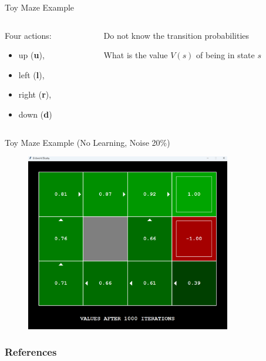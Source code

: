\documentclass[11pt,table]{beamer}
\begin{document}
\begin{frame}{Toy Maze Example}
\vspace{6mm}
\centering
\begin{columns}
\begin{column}{0.4\textwidth}

Four actions:
\begin{itemize}
	\item up (\textbf{u}),
	\item left (\textbf{l}),
	\item right (\textbf{r}),
	\item down (\textbf{d})
\end{itemize}
\end{column}
\begin{column}{0.6\textwidth}
Do not know the transition probabilities

\vspace{3mm}
  \textcolor{red1}{What is the value $V(s)$ of being in state $s$}
\end{column}
\end{columns}
    
\end{frame}


\begin{frame}{Toy Maze Example (No Learning, Noise 20\%)}
\begin{figure}
	\centering
		\includegraphics[width=0.80\textwidth]{figures/gridworld_values.png}
	\label{fig:gridworld_values}
\end{figure}

\end{frame}

\begin{frame}[t,allowframebreaks
]\nocite{*}
\frametitle{References}
\footnotesize

\end{frame}
\end{document}
